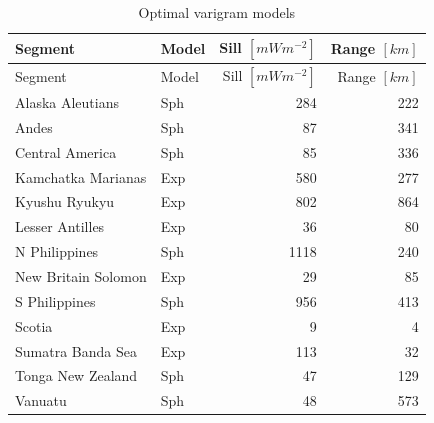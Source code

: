 \documentclass[draft,linenumbers]{agujournal2018}
\begin{document}
\hypertarget{tbl:variogram.summary.table}{}
\begin{longtable}[]{@{}llrr@{}}
\caption{\label{tbl:variogram.summary.table}Optimal varigram
models}\tabularnewline
\toprule
Segment & Model & Sill \([mWm^{-2}]\) & Range \([km]\) \\
\midrule
\endfirsthead
\toprule
Segment & Model & Sill \([mWm^{-2}]\) & Range \([km]\) \\
\midrule
\endhead
Alaska Aleutians & Sph & 284 & 222 \\
Andes & Sph & 87 & 341 \\
Central America & Sph & 85 & 336 \\
Kamchatka Marianas & Exp & 580 & 277 \\
Kyushu Ryukyu & Exp & 802 & 864 \\
Lesser Antilles & Exp & 36 & 80 \\
N Philippines & Sph & 1118 & 240 \\
New Britain Solomon & Exp & 29 & 85 \\
S Philippines & Sph & 956 & 413 \\
Scotia & Exp & 9 & 4 \\
Sumatra Banda Sea & Exp & 113 & 32 \\
Tonga New Zealand & Sph & 47 & 129 \\
Vanuatu & Sph & 48 & 573 \\
\bottomrule
\end{longtable}
\end{document}

